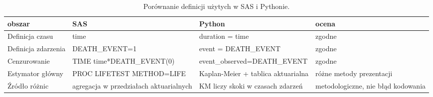 \begin{table}[htbp]
\centering
\caption{Porównanie definicji użytych w SAS i Pythonie.}
\label{tab:sas-python}
\small
\begin{tabular}{llll}
\toprule
obszar & SAS & Python & ocena \\
\midrule
Definicja czasu & time & duration = time & zgodne \\
Definicja zdarzenia & DEATH\_EVENT=1 & event = DEATH\_EVENT & zgodne \\
Cenzurowanie & TIME time*DEATH\_EVENT(0) & event\_observed=DEATH\_EVENT & zgodne \\
Estymator główny & PROC LIFETEST METHOD=LIFE & Kaplan-Meier + tablica aktuarialna & różne metody prezentacji \\
Źródło różnic & agregacja w przedziałach aktuarialnych & KM liczy skoki w czasach zdarzeń & metodologiczne, nie błąd kodowania \\
\bottomrule
\end{tabular}
\end{table}
